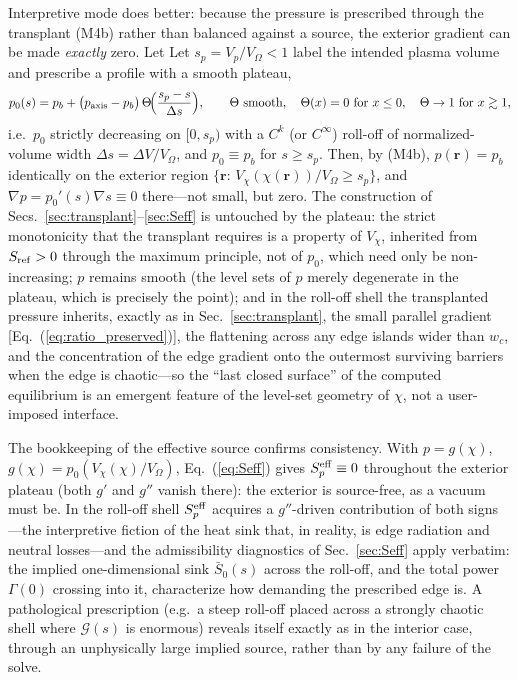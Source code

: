 \documentclass[english]{article}
\newcommand{\br}{\mathbf{r}}
\begin{document}
Interpretive mode does better: because the pressure is prescribed through the transplant (M4b)
rather than balanced against a source, the exterior gradient can be made \emph{exactly} zero. Let
Let $s_p=V_p/V_\Omega<1$ label the intended plasma volume and prescribe a profile with a smooth plateau,
\begin{equation}
p_0(s)=p_b+\big(p_{\rm axis}-p_b\big)\,\Theta\!\Big(\frac{s_p-s}{\Delta s}\Big),
\qquad
\Theta\ \text{smooth},\quad \Theta(x)=0\ \text{for}\ x\le0,\quad
\Theta\rightarrow1\ \text{for}\ x\gtrsim1 ,
\label{eq:p0_plateau}
\end{equation}
i.e.\ $p_0$ strictly decreasing on $[0,s_p)$ with a $C^{k}$ (or $C^\infty$) roll-off of
normalized-volume width $\Delta s=\Delta V/V_\Omega$, and $p_0\equiv p_b$ for $s\ge s_p$.
Then, by (M4b), $p(\br)=p_b$ identically on the exterior region
$\{\br:\,V_\chi(\chi(\br))/V_\Omega\ge s_p\}$, and
$\nabla p=p_0'(s)\nabla s\equiv0$ there---not small, but zero. The construction of
Secs.~\ref{sec:transplant}--\ref{sec:Seff} is untouched by the plateau: the strict monotonicity
that the transplant requires is a property of $V_\chi$, inherited from $S_{\rm ref}>0$ through
the maximum principle, not of $p_0$, which need only be non-increasing; $p$ remains smooth (the
level sets of $p$ merely degenerate in the plateau, which is precisely the point); and in the
roll-off shell the transplanted pressure inherits, exactly as in
Sec.~\ref{sec:transplant}, the small parallel gradient
[Eq.~(\ref{eq:ratio_preserved})], the flattening across any edge islands wider than $w_c$, and the
concentration of the edge gradient onto the outermost surviving barriers when the edge is
chaotic---so the ``last closed surface'' of the computed equilibrium is an emergent feature of the
level-set geometry of $\chi$, not a user-imposed interface.

The bookkeeping of the effective source confirms consistency. With $p=g(\chi)$,
$g(\chi)=p_0(V_\chi(\chi)/V_\Omega)$, Eq.~(\ref{eq:Seff}) gives $S_p^{\rm eff}\equiv0$ throughout the exterior
plateau (both $g'$ and $g''$ vanish there): the exterior is source-free, as a vacuum must be. In
the roll-off shell $S_p^{\rm eff}$ acquires a $g''$-driven contribution of both signs---the
interpretive fiction of the heat sink that, in reality, is edge radiation and neutral
losses---and the admissibility diagnostics of Sec.~\ref{sec:Seff} apply verbatim: the implied
one-dimensional sink $\bar S_0(s)$ across the roll-off, and the total power
$\Gamma(0)$ crossing into it, characterize how demanding the prescribed edge is. A pathological
prescription (e.g.\ a steep roll-off placed across a strongly chaotic shell where $\mathcal G(s)$ is
enormous) reveals itself exactly as in the interior case, through an unphysically large implied
source, rather than by any failure of the solve.
\end{document}
